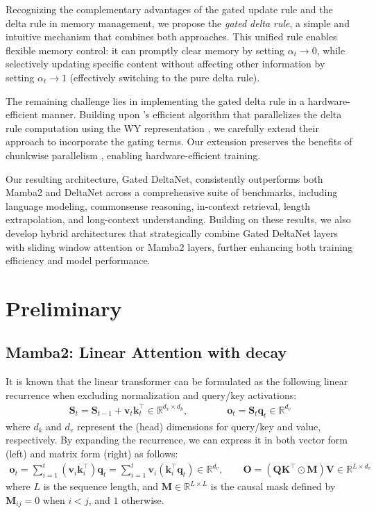 \documentclass{article}
\def\rmK{{\mathbf{K}}}
\def\rmM{{\mathbf{M}}}
\def\rmO{{\mathbf{O}}}
\def\rmQ{{\mathbf{Q}}}
\def\rmS{{\mathbf{S}}}
\def\rmV{{\mathbf{V}}}
\def\vk{{\bm{k}}}
\def\vo{{\bm{o}}}
\def\vq{{\bm{q}}}
\def\vv{{\bm{v}}}
\begin{document}
Recognizing the complementary advantages of the gated update rule and the delta rule in memory management, we propose the \emph{gated delta rule}, a simple and intuitive mechanism that combines both approaches. This unified rule enables flexible memory control: it can promptly clear memory by setting $\alpha_t \rightarrow 0$, while selectively updating specific content without affecting other information by setting $\alpha_t \rightarrow 1$ (effectively switching to the pure delta rule).

The remaining challenge lies in implementing the gated delta rule in a hardware-efficient manner. Building upon \citet{yang2024parallelizing}'s efficient algorithm that parallelizes the delta rule computation using the WY representation \citep{bischof_wy_1985}, we carefully extend their approach to incorporate the gating terms. Our extension preserves the benefits of chunkwise parallelism \citep{hua_transformer_2022, sun2023retentive, yang_gated_2023, yang2024parallelizing}, enabling hardware-efficient training.

Our resulting architecture, Gated DeltaNet,  consistently outperforms both Mamba2 and DeltaNet across a comprehensive suite of benchmarks, including language modeling, commonsense reasoning, in-context retrieval, length extrapolation, and long-context understanding. Building on these results, we also develop hybrid architectures that strategically combine Gated DeltaNet layers with sliding window attention or Mamba2 layers, further enhancing both training efficiency and model performance.

\section{Preliminary}
\subsection{Mamba2: Linear Attention with decay}
It is known that the linear transformer \citep{katharopoulos_transformers_2020}  can be formulated as the following linear recurrence when excluding normalization and query/key activations:
\begin{align*}
    \rmS_t = \rmS_{t-1} + \vv_t \vk_t^\intercal  \in \mathbb{R}^{d_v \times d_k}, \qquad \qquad
    \vo_t = \rmS_t \vq_t \in \mathbb{R}^{d_v}
\end{align*}
where \( d_k \) and \( d_v \) represent the (head) dimensions for query/key and value, respectively. By expanding the recurrence, we can express it in both vector form (left) and matrix form (right) as follows:
\begin{align*}
    \vo_t = \sum_{i=1}^t (\vv_i \vk_i^\intercal) \vq_t = \sum_{i=1}^t \vv_i (\vk_i^\intercal \vq_t) \in \mathbb{R}^{d_v},  \qquad    
    \rmO = (\rmQ \rmK^\intercal  \odot \rmM) \rmV \in \mathbb{R}^{L \times d_v}
\end{align*}
where \( L \) is the sequence length, and \(\rmM \in \mathbb{R}^{L\times L}\) is the causal mask defined by \(\rmM_{ij} = 0\) when \(i < j\), and \(1\) otherwise.  
\end{document}
